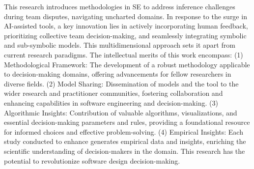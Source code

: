 This research introduces methodologies in SE to address inference challenges during team disputes, navigating uncharted domains. In response to the surge in AI-assisted tools, a key innovation lies in actively incorporating human feedback, prioritizing collective team decision-making, and seamlessly integrating symbolic and sub-symbolic models. This multidimensional approach sets it apart from current research paradigms. The intellectual merits of this work encompass: (1) Methodological Framework: The development of a robust methodology applicable to decision-making domains, offering advancements for fellow researchers in diverse fields. (2) Model Sharing: Dissemination of models and the {\IT} tool to the wider research and practitioner communities, fostering collaboration and enhancing capabilities in software engineering and decision-making. (3) Algorithmic Insights: Contribution of valuable algorithms, visualizations, and essential decision-making parameters and rules, providing a foundational resource for informed choices and effective problem-solving. (4) Empirical Insights: Each study conducted to enhance {\IT} generates empirical data and insights, enriching the scientific understanding of decision-makers in the domain. This research has the potential to revolutionize software design decision-making.







